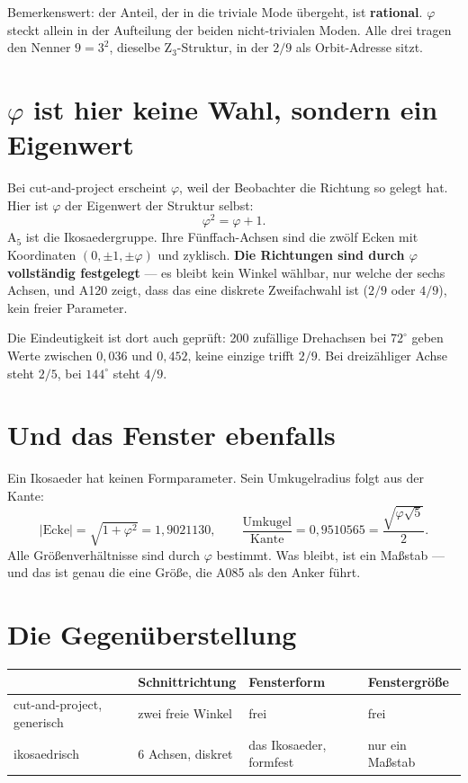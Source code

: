 Bemerkenswert: der Anteil, der in die triviale Mode übergeht, ist
\textbf{rational}. $\varphi$ steckt allein in der Aufteilung der beiden
nicht-trivialen Moden. Alle drei tragen den Nenner $9 = 3^2$, dieselbe
Z$_3$-Struktur, in der $2/9$ als Orbit-Adresse sitzt.

\section{\texorpdfstring{$\varphi$}{phi} ist hier keine Wahl, sondern
ein Eigenwert}

Bei cut-and-project erscheint $\varphi$, weil der Beobachter die
Richtung so gelegt hat. Hier ist $\varphi$ der Eigenwert der Struktur
selbst:
\[
  \varphi^2 = \varphi + 1 .
\]
A$_5$ ist die Ikosaedergruppe. Ihre Fünffach-Achsen sind die zwölf
Ecken mit Koordinaten $(0, \pm1, \pm\varphi)$ und zyklisch. \textbf{Die
Richtungen sind durch $\varphi$ vollständig festgelegt} --- es bleibt
kein Winkel wählbar, nur welche der sechs Achsen, und A120 zeigt, dass
das eine diskrete Zweifachwahl ist ($2/9$ oder $4/9$), kein freier
Parameter.

Die Eindeutigkeit ist dort auch geprüft: 200 zufällige Drehachsen bei
$72^\circ$ geben Werte zwischen $0{,}036$ und $0{,}452$, keine einzige
trifft $2/9$. Bei dreizähliger Achse steht $2/5$, bei $144^\circ$ steht
$4/9$.

\section{Und das Fenster ebenfalls}

Ein Ikosaeder hat keinen Formparameter. Sein Umkugelradius folgt aus
der Kante:
\[
  |\text{Ecke}| = \sqrt{1 + \varphi^2} = 1{,}9021130, \qquad
  \frac{\text{Umkugel}}{\text{Kante}} = 0{,}9510565
  = \frac{\sqrt{\varphi\sqrt5}}{2}.
\]
Alle Größenverhältnisse sind durch $\varphi$ bestimmt. Was bleibt, ist
ein Maßstab --- und das ist genau die eine Größe, die A085 als den
Anker führt.

\section{Die Gegenüberstellung}

\begin{center}
\begin{tabular}{llll}
\toprule
 & Schnittrichtung & Fensterform & Fenstergröße \\
\midrule
cut-and-project, generisch & zwei freie Winkel & frei & frei \\
ikosaedrisch & 6 Achsen, diskret & das Ikosaeder, formfest & nur ein Maßstab \\
\bottomrule
\end{tabular}
\end{center}

